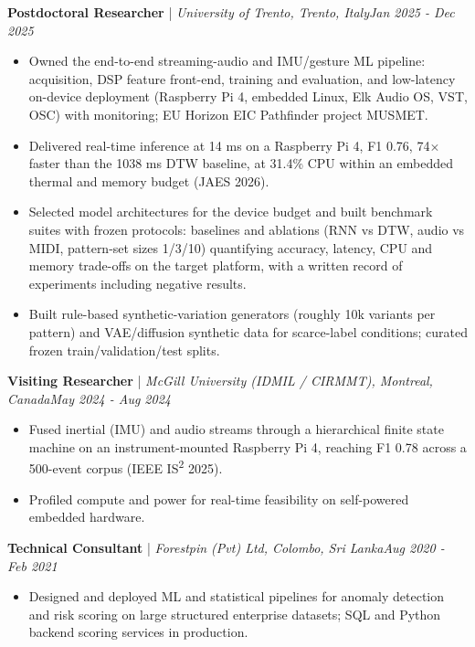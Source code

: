 \documentclass[11pt]{article}
\newenvironment{cvrole}[5]{%
  \par\noindent\textbf{\large #1} | \textit{\small #2, #3}\hfill \textit{\small #4 - #5}\par
  \begin{itemize}[leftmargin=2em, itemsep=-0.3em, topsep=-0.5em]%
}{%
  \end{itemize}\par\noindent\mbox{}\par\vspace{0.1em}%
}
\begin{document}
\begin{cvrole}{Postdoctoral Researcher}{University of Trento}{Trento, Italy}{Jan 2025}{Dec 2025}
    \item Owned the end-to-end streaming-audio and IMU/gesture ML pipeline: acquisition, DSP feature front-end, training and evaluation, and low-latency on-device deployment (Raspberry Pi 4, embedded Linux, Elk Audio OS, VST, OSC) with monitoring; EU Horizon EIC Pathfinder project MUSMET.
    \item Delivered real-time inference at 14 ms on a Raspberry Pi 4, F1 0.76, 74$\times$ faster than the 1038 ms DTW baseline, at 31.4\% CPU within an embedded thermal and memory budget (JAES 2026).
    \item Selected model architectures for the device budget and built benchmark suites with frozen protocols: baselines and ablations (RNN vs DTW, audio vs MIDI, pattern-set sizes 1/3/10) quantifying accuracy, latency, CPU and memory trade-offs on the target platform, with a written record of experiments including negative results.
    \item Built rule-based synthetic-variation generators (roughly 10k variants per pattern) and VAE/diffusion synthetic data for scarce-label conditions; curated frozen train/validation/test splits.
\end{cvrole}

\begin{cvrole}{Visiting Researcher}{McGill University (IDMIL / CIRMMT)}{Montreal, Canada}{May 2024}{Aug 2024}
    \item Fused inertial (IMU) and audio streams through a hierarchical finite state machine on an instrument-mounted Raspberry Pi 4, reaching F1 0.78 across a 500-event corpus (IEEE IS\textsuperscript{2} 2025).
    \item Profiled compute and power for real-time feasibility on self-powered embedded hardware.
\end{cvrole}

\begin{cvrole}{Technical Consultant}{Forestpin (Pvt) Ltd}{Colombo, Sri Lanka}{Aug 2020}{Feb 2021}
    \item Designed and deployed ML and statistical pipelines for anomaly detection and risk scoring on large structured enterprise datasets; SQL and Python backend scoring services in production.
\end{cvrole}
\end{document}
